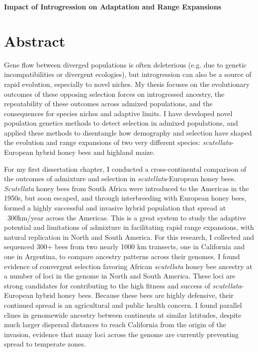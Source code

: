 \begin{center}
   \textbf{Impact of Introgression on Adaptation and Range Expansions} \\
\end{center}

\section*{Abstract}

	Gene flow between diverged populations is often deleterious (e.g. due to genetic incompatibilities or divergent ecologies),
	but introgression can also be a source of rapid evolution, especially to novel niches.
	My thesis focuses on the evolutionary outcomes of these opposing selection forces on introgressed ancestry,
	the repeatability of these outcomes across admixed populations,
	and the consequences for species niches and adaptive limits.
	I have developed novel population genetics methods to detect selection in admixed populations,
	and applied these methods to disentangle how demography and selection have shaped the evolution
	and range expansions of two very different species: \textit{scutellata}-European hybrid honey bees and highland maize.
	
	For my first dissertation chapter, I conducted a cross-continental comparison of the outcomes of admixture and selection in \textit{scutellata}-European honey bees.
	\textit{Scutellata} honey bees from South Africa were introduced to the Americas in the 1950s, but soon escaped, and through interbreeding with European honey bees,
	formed a highly successful and invasive hybrid population that spread at ~300km/year across the Americas.
	This is a great system to study the adaptive potential and limitations of admixture in facilitating rapid range expansions,
	with natural replication in North and South America.
	For this research, I collected and sequenced 300+ bees from two nearly 1000 km transects,
	one in California and one in Argentina, to compare ancestry patterns across their genomes.
	I found evidence of convergent selection favoring African \textit{scutellata} honey bee ancestry at a number of loci in the genome in North and South America.
	These loci are strong candidates for contributing to the high fitness and success of \textit{scutellata}-European hybrid honey bees.
	Because these bees are highly defensive, their continued spread is an agricultural and public health concern.
	I found parallel clines in genomewide ancestry between continents at similar latitudes,
	despite much larger dispersal distances to reach California from the origin of the invasion,
	evidence that many loci across the genome are currently preventing spread to temperate zones.
	
